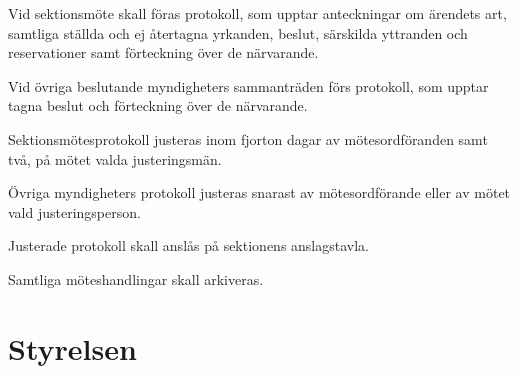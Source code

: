 \documentclass[stadgar]{dsekprotokoll}
\begin{document}
\begin{stadgeavsnitt}


Vid sektionsmöte skall föras protokoll, som upptar anteckningar om ärendets
art, samtliga ställda och ej återtagna yrkanden, beslut, särskilda
yttranden och reservationer samt förteckning över de närvarande.


Vid övriga beslutande myndigheters sammanträden förs protokoll, som upptar
tagna beslut och förteckning över de närvarande.


Sektionsmötesprotokoll justeras inom fjorton dagar av mötesordföranden samt två, på mötet valda justeringsmän.

Övriga myndigheters protokoll justeras snarast av mötesordförande eller av mötet vald justeringsperson.


Justerade protokoll skall anslås på sektionens anslagstavla.


Samtliga möteshandlingar skall arkiveras.

\end{stadgeavsnitt}

\section{Styrelsen}
\end{document}
